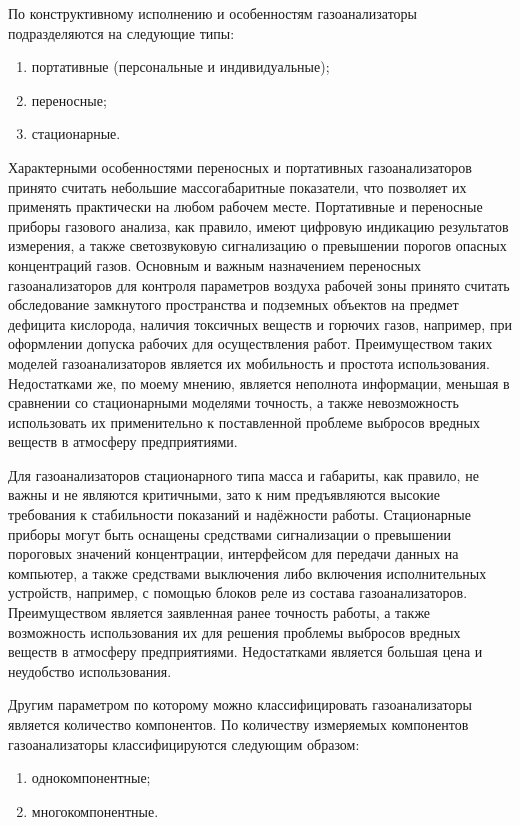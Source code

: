 \documentclass[14pt, a4paper]{extreport}
\begin{document}
	По конструктивному исполнению и особенностям газоанализаторы подразделяются на следующие типы:
	\begin{enumerate}[label={\arabic*)}]
		\item портативные (персональные и индивидуальные);
		\item переносные;
		\item стационарные.
	\end{enumerate}	

	Характерными особенностями переносных и портативных газоанализаторов принято считать небольшие массогабаритные показатели, что позволяет их применять практически на любом рабочем месте. Портативные и переносные приборы газового анализа, как правило, имеют цифровую индикацию результатов измерения, а также светозвуковую сигнализацию о превышении порогов опасных концентраций газов. Основным и важным назначением переносных газоанализаторов для контроля параметров воздуха рабочей зоны принято считать обследование замкнутого пространства и подземных объектов на предмет дефицита кислорода, наличия токсичных веществ и горючих газов, например, при оформлении допуска рабочих для осуществления работ. Преимуществом таких моделей газоанализаторов является их мобильность и простота использования. Недостатками же, по моему мнению, является неполнота информации, меньшая в сравнении со стационарными моделями точность, а также невозможность использовать их применительно к поставленной проблеме выбросов вредных веществ в атмосферу предприятиями.
	
	Для газоанализаторов стационарного типа масса и габариты, как правило, не важны и не являются критичными, зато к ним предъявляются высокие требования к стабильности показаний и надёжности работы. Стационарные приборы могут быть оснащены средствами сигнализации о превышении пороговых значений концентрации, интерфейсом для передачи данных на компьютер, а также средствами выключения либо включения исполнительных устройств, например, с помощью блоков реле из состава газоанализаторов. Преимуществом является заявленная ранее точность работы, а также возможность использования их для решения проблемы выбросов вредных веществ в атмосферу предприятиями. Недостатками является большая цена и неудобство использования.
	
	Другим параметром по которому можно классифицировать газоанализаторы является количество компонентов. По количеству измеряемых компонентов газоанализаторы классифицируются следующим образом:
	\begin{enumerate}[label={\arabic*)}]
		\item однокомпонентные;
		\item многокомпонентные.
	\end{enumerate}
\end{document}
